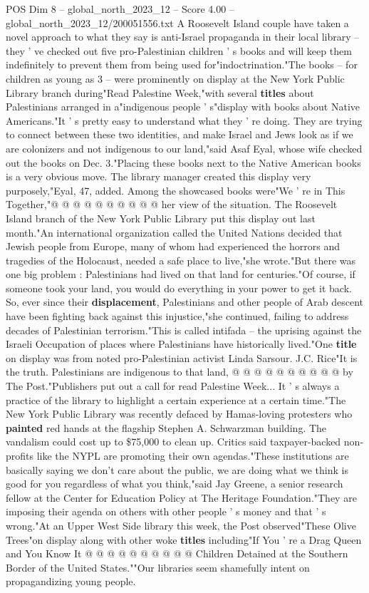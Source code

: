 \begin{textsample}{POS Dim 8 – global\_north\_2023\_12 – Score 4.00 – global\_north\_2023\_12/200051556.txt}  \label{ex:f8_pos_274}
A Roosevelt Island couple have taken a novel approach to what they say is anti-Israel propaganda in their local library -- they ' ve checked out five pro-Palestinian children ' s books and will keep them indefinitely to prevent them from being used for"indoctrination."The books -- for children as young as 3 -- were prominently on display at the New York Public Library branch during"Read Palestine Week,"with several \textbf{titles} about Palestinians arranged in a"indigenous people ' s"display with books about Native Americans."It ' s pretty easy to understand what they ' re doing.
They are trying to connect between these two identities, and make Israel and Jews look as if we are colonizers and not indigenous to our land,"said Asaf Eyal, whose wife checked out the books on Dec. 3."Placing these books next to the Native American books is a very obvious move.
The library manager created this display very purposely,"Eyal, 47, added.
Among the showcased books were"We ' re in This Together,"@ @ @ @ @ @ @ @ @ @ her view of the situation.
The Roosevelt Island branch of the New York Public Library put this display out last month."An international organization called the United Nations decided that Jewish people from Europe, many of whom had experienced the horrors and tragedies of the Holocaust, needed a safe place to live,"she wrote."But there was one big problem : Palestinians had lived on that land for centuries."Of course, if someone took your land, you would do everything in your power to get it back.
So, ever since their \textbf{displacement}, Palestinians and other people of Arab descent have been fighting back against this injustice,"she continued, failing to address decades of Palestinian terrorism."This is called intifada -- the uprising against the Israeli Occupation of places where Palestinians have historically lived."One \textbf{title} on display was from noted pro-Palestinian activist Linda Sarsour.
J.C.
Rice"It is the truth.
Palestinians are indigenous to that land, @ @ @ @ @ @ @ @ @ @ by The Post."Publishers put out a call for read Palestine Week...
It ' s always a practice of the library to highlight a certain experience at a certain time."The New York Public Library was recently defaced by Hamas-loving protesters who \textbf{painted} red hands at the flagship Stephen A.
Schwarzman building.
The vandalism could cost up to \$75,000 to clean up.
Critics said taxpayer-backed non-profits like the NYPL are promoting their own agendas."These institutions are basically saying we don't care about the public, we are doing what we think is good for you regardless of what you think,"said Jay Greene, a senior research fellow at the Center for Education Policy at The Heritage Foundation."They are imposing their agenda on others with other people ' s money and that ' s wrong."At an Upper West Side library this week, the Post observed"These Olive Trees"on display along with other woke \textbf{titles} including"If You ' re a Drag Queen and You Know It @ @ @ @ @ @ @ @ @ @ Children Detained at the Southern Border of the United States.""Our libraries seem shamefully intent on propagandizing young people.

\end{textsample}
